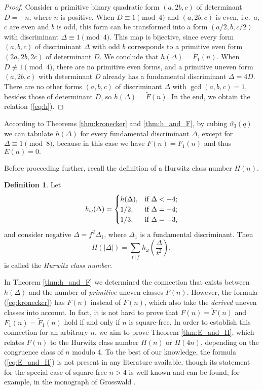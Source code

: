 \documentclass{mcom-l}
\theoremstyle{definition}
\newtheorem{defin}[thm]{Definition}
\begin{document}
\begin{proof}
Consider a primitive binary quadratic form $(a, 2b, c)$ of determinant $D = -n$,
where $n$ is positive. When $D \equiv 1 \pmod{4}$ and $(a, 2b, c)$ is
even, i.e.\ $a$, $c$ are even and $b$ is odd, this form can be
transformed into a form $(a/2,b,c/2)$ with discriminant $\Delta \equiv
1 \pmod{4}$. This map is bijective, since every form $(a, b, c)$ of
discriminant $\Delta$ with odd $b$ corresponds to a primitive even
form $(2a, 2b, 2c)$ of determinant $D$. We conclude that $h(\Delta) =
\tilde{F}_1(n)$. When $D \not\equiv 1 \pmod{4}$, there are no
primitive even forms, and a primitive uneven form $(a, 2b, c)$ with
determinant $D$ already has a fundamental discriminant $\Delta =
4D$. There are no other forms $(a, b, c)$ of discriminant $\Delta$
with $\gcd(a, b, c) = 1$, besides those of determinant $D$, so
$h(\Delta) = \tilde{F}(n)$. In the end, we obtain the relation
(\ref{eq:h}).
\end{proof}

According to Theorems \ref{thm:kronecker} and \ref{thm:h_and_F}, by
cubing $\vartheta_3(q)$ we can tabulate $h(\Delta)$ for every
fundamental discriminant $\Delta$, except for $\Delta \equiv 1
\pmod{8}$, because in this case we have $F(n) = F_1(n)$ and thus $E(n)
= 0.$

Before proceeding further, recall the definition of a Hurwitz class number $H(n)$.
\begin{defin} \label{defin:hurwitz}
Let
\begin{equation} \label{eq:h_omega}
h_\omega(\Delta) = \begin{cases}
h(\Delta), & \textnormal{if $\Delta < -4$;}\\
1/2, & \textnormal{if $\Delta = -4$;}\\
1/3, & \textnormal{if $\Delta = -3$,}\\
\end{cases}
\end{equation}
and consider negative $\Delta = f^2 \Delta_1$, where $\Delta_1$ is a
fundamental discriminant. Then
$$
H\left(|\Delta|\right) = \sum\limits_{t\,|\,f}h_\omega\left(\frac{\Delta}{t^2}\right),
$$
is called the \emph{Hurwitz class number}.
\end{defin}

In Theorem \ref{thm:h_and_F} we determined the connection that exists
between $h(\Delta)$ and the number of \emph{primitive} uneven classes
$\tilde{F}(n)$. However, the formula (\ref{eq:kronecker}) has $F(n)$
instead of $\tilde{F}(n)$, which also take the \emph{derived} uneven
classes into account. In fact, it is not hard to prove that $F(n) =
\tilde{F}(n)$ and $F_1(n) = \tilde{F}_1(n)$ hold if and only if $n$ is
square-free. In order to establish this connection for an arbitrary
$n$, we aim to prove Theorem \ref{thm:E_and_H}, which relates $F(n)$
to the Hurwitz class number $H(n)$ or $H(4n)$, depending on the
congruence class of $n$ modulo 4. To the best of our knowledge, the
formula (\ref{eq:E_and_H}) is not present in any literature available,
though its statement for the special case of square-free $n > 4$ is well known
and can be found, for example, in the monograph of Grosswald \cite[Chapter~4, Theorem~2]{grosswald}.
\end{document}
